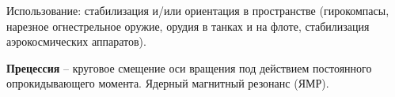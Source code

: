 \documentclass[12pt,epsfig,color,russian]{article}
\begin{document}
Использование: стабилизация и/или ориентация в пространстве (ги\-ро\-компасы, нарезное огнестрельное оружие, орудия в танках и на флоте, ста\-би\-ли\-зация аэрокосмических аппаратов).

{\bf Прецессия} -- круговое смещение оси вращения под действием посто\-ян\-ного опрокидывающего момента. Ядерный магнитный резонанс (ЯМР).
\end{document}
